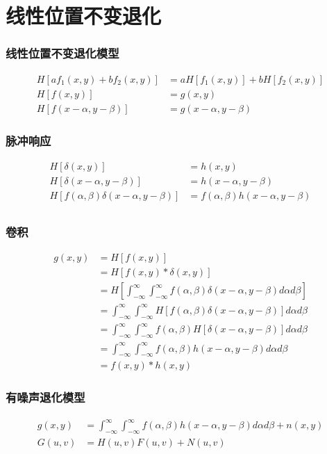 \documentclass{beamer}
\begin{document}
\section{线性位置不变退化}
\label{sec-9}
\begin{frame}
\frametitle{线性位置不变退化模型}
\label{sec-9-1}

\begin{align*}
 H[af_1(x,y)+bf_2(x,y)] &= aH[f_1(x,y)]+bH[f_2(x,y)] \\
  H[f(x,y)] &= g(x,y) \\
 H[f(x-\alpha,y-\beta)] &= g(x-\alpha,y-\beta)
\end{align*}
\end{frame}
\begin{frame}
\frametitle{脉冲响应}
\label{sec-9-2}

\begin{align*}
H[\delta(x,y)] &= h(x,y) \\
H[\delta(x-\alpha,y-\beta)] &= h(x-\alpha,y-\beta) \\
H[f(\alpha,\beta)\delta(x-\alpha,y-\beta)] &=f(\alpha,\beta)h(x-\alpha,y-\beta) \\
\end{align*}
\end{frame}
\begin{frame}
\frametitle{卷积}
\label{sec-9-3}

\begin{align*}
g(x,y) &=H[f(x,y)] \\
&= H[f(x,y)*\delta(x,y)] \\
&= H\left[\int_{-\infty}^{\infty}\int_{-\infty}^{\infty} f(\alpha,\beta)\delta(x-\alpha,y-\beta) d\alpha d\beta\right] \\
&= \int_{-\infty}^{\infty}\int_{-\infty}^{\infty} H[f(\alpha,\beta)\delta(x-\alpha,y-\beta)] d\alpha d\beta \\
&= \int_{-\infty}^{\infty}\int_{-\infty}^{\infty} f(\alpha,\beta)H[\delta(x-\alpha,y-\beta)] d\alpha d\beta \\
&= \int_{-\infty}^{\infty}\int_{-\infty}^{\infty} f(\alpha,\beta)h(x-\alpha,y-\beta)d\alpha d\beta \\
&= f(x,y)*h(x,y)
\end{align*}
\end{frame}
\begin{frame}
\frametitle{有噪声退化模型}
\label{sec-9-4}

\begin{align*}
g(x,y) &=\int_{-\infty}^{\infty}\int_{-\infty}^{\infty} f(\alpha,\beta)h(x-\alpha,y-\beta) d\alpha d\beta +n(x,y)\\
G(u,v) &= H(u,v)F(u,v)+N(u,v)
\end{align*}
\end{frame}
\end{document}
